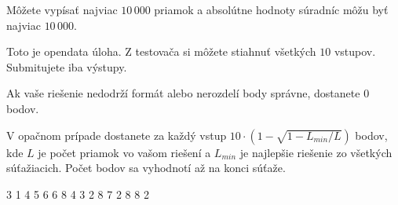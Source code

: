 Môžete vypísať najviac $10\,000$ priamok a absolútne hodnoty súradníc môžu byť najviac $10\,000$.

Toto je opendata úloha. Z testovača si môžete stiahnuť všetkých $10$ vstupov.
Submitujete iba výstupy.

Ak vaše riešenie nedodrží formát alebo nerozdelí body správne, dostanete $0$ bodov.

V opačnom prípade dostanete za každý vstup
$ 10 \cdot \left(1 - \sqrt{1 - L_{min} / L}\right)$ bodov,
kde $L$ je počet priamok vo vašom riešení a $L_{min}$ je najlepšie riešenie zo všetkých súťažiacich.
Počet bodov sa vyhodnotí až na konci súťaže.


3 1
4 5
6 6
8 4
3 2 8 7
2 8 8 2
\sampleEND


